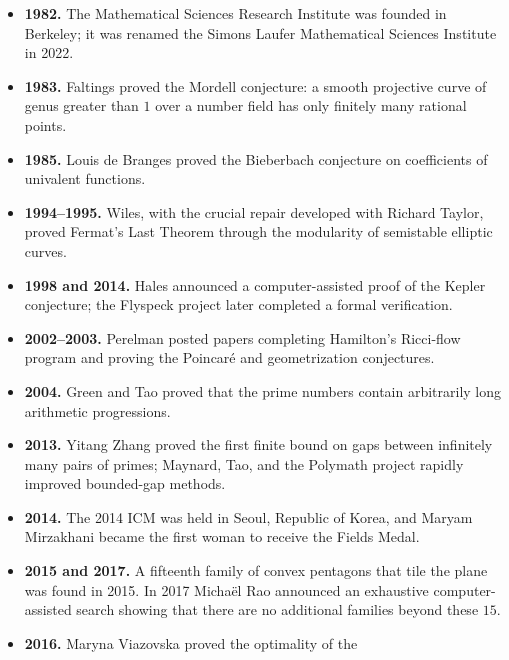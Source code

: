 \begin{itemize}
              computer-assisted proof of the Four Color Theorem in 1976 and
              published it in 1977, creating a landmark debate about
              computer-assisted proof.
        \item \textbf{1982.} The Mathematical Sciences Research Institute was
              founded in Berkeley; it was renamed the Simons Laufer
              Mathematical Sciences Institute in 2022.
        \item \textbf{1983.} Faltings proved the Mordell conjecture: a smooth
              projective curve of genus greater than $1$ over a number field
              has only finitely many rational points.
        \item \textbf{1985.} Louis de Branges proved the Bieberbach conjecture
              on coefficients of univalent functions.
        \item \textbf{1994--1995.} Wiles, with the crucial repair developed
              with Richard Taylor, proved Fermat's Last Theorem through the
              modularity of semistable elliptic curves.
        \item \textbf{1998 and 2014.} Hales announced a computer-assisted proof
              of the Kepler conjecture; the Flyspeck project later completed a
              formal verification.
        \item \textbf{2002--2003.} Perelman posted papers completing Hamilton's
              Ricci-flow program and proving the Poincaré and geometrization
              conjectures.
        \item \textbf{2004.} Green and Tao proved that the prime numbers contain
              arbitrarily long arithmetic progressions.
        \item \textbf{2013.} Yitang Zhang proved the first finite bound on gaps
              between infinitely many pairs of primes; Maynard, Tao, and the
              Polymath project rapidly improved bounded-gap methods.
        \item \textbf{2014.} The 2014 ICM was held in Seoul, Republic of Korea, and Maryam
              Mirzakhani became the first woman to receive the Fields Medal.
        \item \textbf{2015 and 2017.} A fifteenth family of convex pentagons
              that tile the plane was found in 2015. In 2017 Micha\"el Rao
              announced an exhaustive computer-assisted search showing that
              there are no additional families beyond these $15$.
        \item \textbf{2016.} Maryna Viazovska proved the optimality of the

\end{itemize}

